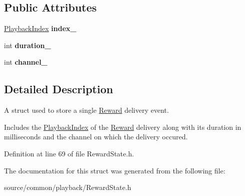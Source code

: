 \subsection*{Public Attributes}
\begin{DoxyCompactItemize}
\item 
\hypertarget{struct_picto_1_1_playback_reward_data_a799dbb8bcbf70e41a1ecbbc0a1906074}{\hyperlink{struct_picto_1_1_playback_index}{Playback\-Index} {\bfseries index\-\_\-}}\label{struct_picto_1_1_playback_reward_data_a799dbb8bcbf70e41a1ecbbc0a1906074}

\item 
\hypertarget{struct_picto_1_1_playback_reward_data_acafb5a439f5e1ad2cac4e2515cc49874}{int {\bfseries duration\-\_\-}}\label{struct_picto_1_1_playback_reward_data_acafb5a439f5e1ad2cac4e2515cc49874}

\item 
\hypertarget{struct_picto_1_1_playback_reward_data_a5a686d863a19df9ba4417e90ed519fba}{int {\bfseries channel\-\_\-}}\label{struct_picto_1_1_playback_reward_data_a5a686d863a19df9ba4417e90ed519fba}

\end{DoxyCompactItemize}


\subsection{Detailed Description}
A struct used to store a single \hyperlink{class_picto_1_1_reward}{Reward} delivery event. 

Includes the \hyperlink{struct_picto_1_1_playback_index}{Playback\-Index} of the \hyperlink{class_picto_1_1_reward}{Reward} delivery along with its duration in milliseconds and the channel on which the delivery occured. 

Definition at line 69 of file Reward\-State.\-h.



The documentation for this struct was generated from the following file\-:\begin{DoxyCompactItemize}
\item 
source/common/playback/Reward\-State.\-h\end{DoxyCompactItemize}
